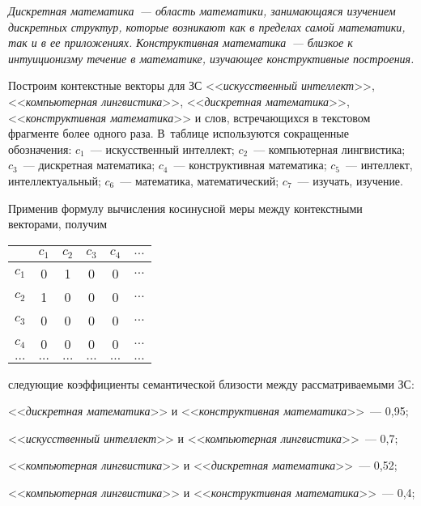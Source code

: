 \begin{multicols}{2}
\noindent
\textit{Дискретная математика~--- область математики, занимающаяся 
изучением дискретных структур, которые возникают как в пределах 
самой математики, так и в ее приложениях.}
\noindent
\textit{Конструктивная математика~--- близкое к интуиционизму течение 
в математике, изучающее конструктивные построения.}

Построим контекстные векторы для ЗС <<\textit{искусственный 
интеллект}>>, <<\textit{компьютерная лингвистика}>>, 
<<\textit{дискретная математика}>>, <<\textit{конструктивная 
математика}>> и слов, встречающихся в текстовом фрагменте более 
одного раза. В~таблице используются сокращенные обозначения: 
$c_1$~--- искусственный интеллект;  $c_2$~--- компьютерная 
лингвистика; $c_3$~--- дискретная математика; $c_4$~--- конструктивная 
математика; $c_5$~--- интеллект, интеллектуальный; $c_6$~--- 
математика, математический; $c_7$~--- изучать, изучение.

    Применив формулу вычисления косинусной меры между 
контекстными векторами, получим\linebreak\vspace*{-12pt}


\begin{center}
\vspace*{1pt}
\begin{tabular}{|c|c|c|c|c|c|}
\hline
&$c_1$&$c_2$&$c_3$&$c_4$&$\ldots$\\
\hline
$c_1$&0&1&0&0&$\ldots$\\
$c_2$&1&0&0&0&$\ldots$\\
$c_3$&0&0&0&0&$\ldots$\\
$c_4$&0&0&0&0&$\ldots$\\
$\ldots$&$\ldots$&$\ldots$&$\ldots$&$\ldots$&$\ldots$\\
\hline
\end{tabular}
\vspace*{6pt}
\end{center}

\noindent
 следующие коэффициенты 
семантической бли\-зости между рассматриваемыми ЗС:

<<\textit{дискретная математика}>> и <<\textit{конструктивная 
математика}>>~--- 0,95;

<<\textit{искусственный интеллект}>> и <<\textit{компьютерная 
лингвистика}>>~--- 0,7;

<<\textit{компьютерная лингвистика}>> и <<\textit{дискретная 
математика}>>~--- 0,52;

<<\textit{компьютерная лингвистика}>> и <<\textit{конструктивная 
математика}>>~--- 0,4;


\end{multicols}
